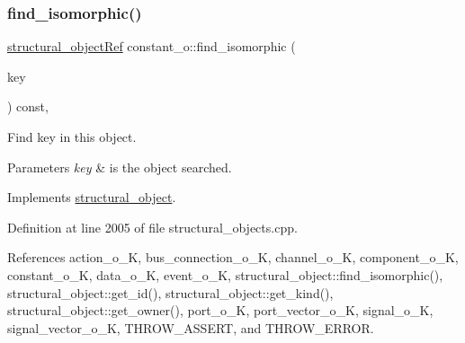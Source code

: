 \subsubsection{\texorpdfstring{find\+\_\+isomorphic()}{find\_isomorphic()}}
{\footnotesize\ttfamily \hyperlink{structural__objects_8hpp_a8ea5f8cc50ab8f4c31e2751074ff60b2}{structural\+\_\+object\+Ref} constant\+\_\+o\+::find\+\_\+isomorphic (\begin{DoxyParamCaption}\item[{const \hyperlink{structural__objects_8hpp_a8ea5f8cc50ab8f4c31e2751074ff60b2}{structural\+\_\+object\+Ref}}]{key }\end{DoxyParamCaption}) const\hspace{0.3cm}{\ttfamily [override]}, {\ttfamily [virtual]}}



Find key in this object. 


\begin{DoxyParams}{Parameters}
{\em key} & is the object searched. \\
\hline
\end{DoxyParams}


Implements \hyperlink{classstructural__object_a87756f7dab3d9a866c81b96b88e11380}{structural\+\_\+object}.



Definition at line 2005 of file structural\+\_\+objects.\+cpp.



References action\+\_\+o\+\_\+K, bus\+\_\+connection\+\_\+o\+\_\+K, channel\+\_\+o\+\_\+K, component\+\_\+o\+\_\+K, constant\+\_\+o\+\_\+K, data\+\_\+o\+\_\+K, event\+\_\+o\+\_\+K, structural\+\_\+object\+::find\+\_\+isomorphic(), structural\+\_\+object\+::get\+\_\+id(), structural\+\_\+object\+::get\+\_\+kind(), structural\+\_\+object\+::get\+\_\+owner(), port\+\_\+o\+\_\+K, port\+\_\+vector\+\_\+o\+\_\+K, signal\+\_\+o\+\_\+K, signal\+\_\+vector\+\_\+o\+\_\+K, T\+H\+R\+O\+W\+\_\+\+A\+S\+S\+E\+RT, and T\+H\+R\+O\+W\+\_\+\+E\+R\+R\+OR.

